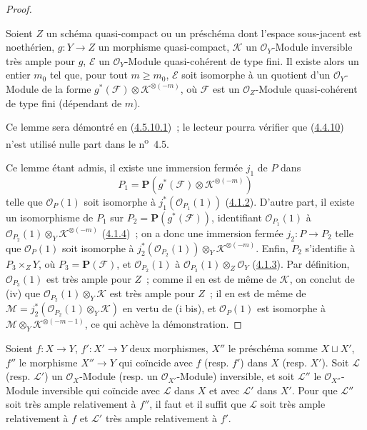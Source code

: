 \begin{proof}
\begin{lemma}[4.4.10.1]
\label{II.4.4.10.1-fr}
Soient $Z$ un schéma quasi-compact ou un préschéma dont l'espace sous-jacent
est noethérien, $g:Y\to Z$ un morphisme quasi-compact, $\mathcal{K}$ un
$\mathcal{O}_Y$-Module inversible très ample pour $g$, $\mathcal{E}$ un
$\mathcal{O}_Y$-Module quasi-cohérent de type fini. Il existe alors un entier
$m_0$ tel que, pour tout $m\geq m_0$, $\mathcal{E}$ soit isomorphe à un
quotient d'un $\mathcal{O}_Y$-Module de la forme
$g^*(\mathcal{F})\otimes\mathcal{K}^{\otimes(-m)}$, où $\mathcal{F}$ est un
$\mathcal{O}_Z$-Module quasi-cohérent de type fini (dépendant de $m$).
\end{lemma}

Ce lemme sera démontré en (\hyperref[II.4.5.10.1-fr]{4.5.10.1})~; le lecteur
pourra vérifier que (\hyperref[II.4.4.10-fr]{4.4.10}) n'est utilisé nulle part
dans le n\textsuperscript{o}~4.5.


Ce lemme étant admis, il existe une immersion fermée $j_1$ de $P$ dans
\[
  P_1=\mathbf{P}(g^*(\mathcal{F})\otimes\mathcal{K}^{\otimes(-m)})
\]
telle que $\mathcal{O}_P(1)$ soit isomorphe à
$j_1^*(\mathcal{O}_{P_1}(1))$ (\hyperref[II.4.1.2-fr]{4.1.2}). D'autre part,
il existe un isomorphisme de $P_1$ sur
$P_2=\mathbf{P}(g^*(\mathcal{F}))$, identifiant
$\mathcal{O}_{P_1}(1)$ à
$\mathcal{O}_{P_2}(1)\otimes_Y\mathcal{K}^{\otimes(-m)}$
(\hyperref[II.4.1.4-fr]{4.1.4})~; on a donc une immersion fermée
$j_2:P\to P_2$ telle que $\mathcal{O}_P(1)$ soit isomorphe à
$j_2^*(\mathcal{O}_{P_2}(1))\otimes_Y\mathcal{K}^{\otimes(-m)}$. Enfin,
$P_2$ s'identifie à $P_3\times_ZY$, où $P_3=\mathbf{P}(\mathcal{F})$, et
$\mathcal{O}_{P_2}(1)$ à
$\mathcal{O}_{P_3}(1)\otimes_Z\mathcal{O}_Y$
(\hyperref[II.4.1.3-fr]{4.1.3}). Par définition,
$\mathcal{O}_{P_3}(1)$ est très ample pour $Z$~; comme il en est de même de
$\mathcal{K}$, on conclut de (iv) que
$\mathcal{O}_{P_2}(1)\otimes_Y\mathcal{K}$ est très ample pour $Z$~; il en
est de même de
$\mathcal{M}=j_2^*(\mathcal{O}_{P_2}(1)\otimes_Y\mathcal{K})$ en vertu de
(i bis), et $\mathcal{O}_P(1)$ est isomorphe à
$\mathcal{M}\otimes_Y\mathcal{K}^{\otimes(-m-1)}$, ce qui achève la
démonstration.
\end{proof}

\begin{proposition}[4.4.11]
\label{II.4.4.11-fr}
Soient $f:X\to Y$, $f':X'\to Y$ deux morphismes, $X''$ le préschéma somme
$X\sqcup X'$, $f''$ le morphisme $X''\to Y$ qui coïncide avec $f$ (resp.
$f'$) dans $X$ (resp. $X'$). Soit $\mathcal{L}$ (resp. $\mathcal{L}'$) un
$\mathcal{O}_X$-Module (resp. un $\mathcal{O}_{X'}$-Module) inversible, et
soit $\mathcal{L}''$ le $\mathcal{O}_{X''}$-Module inversible qui coïncide
avec $\mathcal{L}$ dans $X$ et avec $\mathcal{L}'$ dans $X'$. Pour que
$\mathcal{L}''$ soit très ample relativement à $f''$, il faut et il suffit
que $\mathcal{L}$ soit très ample relativement à $f$ et $\mathcal{L}'$ très
ample relativement à $f'$.
\end{proposition}


